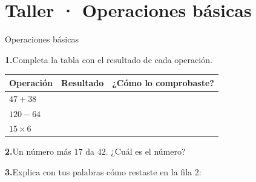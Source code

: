 

\renewcommand{\hdrcapitulo}{Ejemplo · Guías del Profe}



\section{Taller · Operaciones básicas}

\begin{hoja}{Operaciones básicas}

\textbf{1.}\enspace Completa la tabla con el resultado de cada operación.
\par\smallskip
{\centering\renewcommand{\arraystretch}{2.4}\sffamily\small
\begin{tabular}{|>{\centering\arraybackslash}p{3cm}|>{\centering\arraybackslash}p{3cm}|>{\centering\arraybackslash}p{3.6cm}|}
\hline
\textbf{Operación} & \textbf{Resultado} & \textbf{¿Cómo lo comprobaste?} \\\hline
$47 + 38$  & & \\\hline
$120 - 64$ & & \\\hline
$15 \times 6$ & & \\\hline
\end{tabular}\par}

\vspace{0.6em}
\textbf{2.}\enspace Un número más $17$ da $42$. ¿Cuál es el número?\quad \linea[3.5cm]

\vspace{0.4em}
\textbf{3.}\enspace Explica con tus palabras cómo restaste en la fila 2:
\lineaescritura\lineaescritura

\end{hoja}


